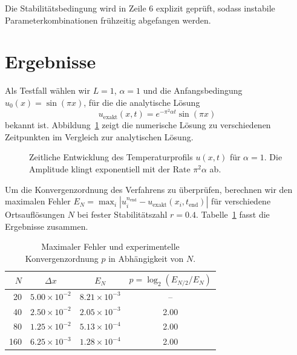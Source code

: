 \documentclass[11pt,a4paper]{article}
\begin{document}
Die Stabilitätsbedingung wird in Zeile 6 explizit geprüft, sodass instabile
Parameterkombinationen frühzeitig abgefangen werden.

\section{Ergebnisse}
Als Testfall wählen wir $L = 1$, $\alpha = 1$ und die Anfangsbedingung
$u_0(x) = \sin(\pi x)$, für die die analytische Lösung
\begin{equation}
u_{\text{exakt}}(x,t) = e^{-\pi^2 \alpha t} \sin(\pi x)
\end{equation}
bekannt ist. Abbildung~\ref{fig:profile} zeigt die numerische Lösung zu verschiedenen
Zeitpunkten im Vergleich zur analytischen Lösung.

\begin{figure}[htbp]
\centering
{}
\caption{Zeitliche Entwicklung des Temperaturprofils $u(x,t)$ für $\alpha = 1$.
Die Amplitude klingt exponentiell mit der Rate $\pi^2 \alpha$ ab.}
\label{fig:profile}
\end{figure}

Um die Konvergenzordnung des Verfahrens zu überprüfen, berechnen wir den maximalen
Fehler $E_N = \max_i |u_i^{n_{\text{end}}} - u_{\text{exakt}}(x_i, t_{\text{end}})|$
für verschiedene Ortsauflösungen $N$ bei fester Stabilitätszahl $r = 0.4$.
Tabelle~\ref{tab:convergence} fasst die Ergebnisse zusammen.

\begin{table}[htbp]
\centering
\caption{Maximaler Fehler und experimentelle Konvergenzordnung $p$ in Abhängigkeit von $N$.}
\label{tab:convergence}
\begin{tabular}{@{}rccc@{}}
\toprule
$N$ & $\Delta x$ & $E_N$ & $p = \log_2(E_{N/2}/E_N)$ \\
\midrule
20  & $5.00 \times 10^{-2}$ & $8.21 \times 10^{-3}$ & --   \\
40  & $2.50 \times 10^{-2}$ & $2.05 \times 10^{-3}$ & 2.00 \\
80  & $1.25 \times 10^{-2}$ & $5.13 \times 10^{-4}$ & 2.00 \\
160 & $6.25 \times 10^{-3}$ & $1.28 \times 10^{-4}$ & 2.00 \\
\bottomrule
\end{tabular}
\end{table}
\end{document}
